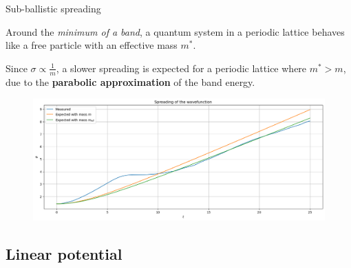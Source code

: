 \begin{frame}{Sub-ballistic spreading}
    \small

    Around the \textit{minimum of a band}, a quantum system in a periodic lattice behaves like a free particle with an effective mass $m^*$.

    \vfill

    Since $\sigma\propto\frac{1}{m}$, a slower spreading is expected for a periodic lattice where $m^*>m$, due to the \textbf{parabolic approximation} of the band energy.

    \vfill

    \begin{figure}[H]
        \centering
        \includegraphics[width=\textwidth]{Immagini/plot-effective-mass.png}
    \end{figure}

    \normalsize
\end{frame}

\subsection{Linear potential}

